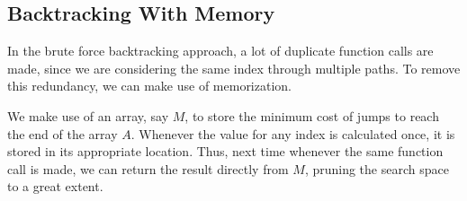 \subsection{Backtracking With Memory}
In the brute force backtracking approach, a lot of duplicate function calls are made, since we are considering the same index through multiple paths. To remove this redundancy, we can make use of memorization.

We make use of an array, say $M$, to store the minimum cost of jumps to reach the end of the array $A$. Whenever the value for any index is calculated once, it is stored in its appropriate location. Thus, next time whenever the same function call is made, we can return the result directly from $M$, pruning the search space to a great extent.